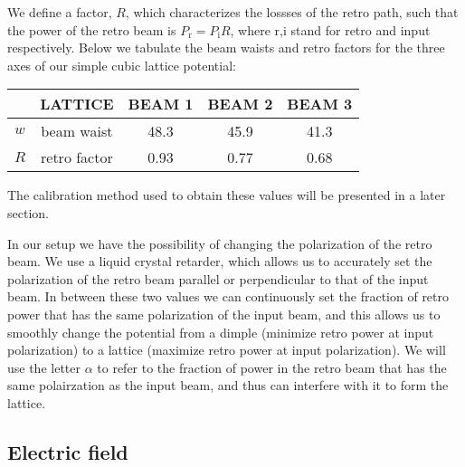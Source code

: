 \documentclass[11pt,letter]{article}
\begin{document}
We define a factor, $R$,  which characterizes the lossses of the retro path,
such that the power of the retro beam is $P_{\text{r}} = P_{\text{i}} R$, where
r,i stand for retro and input respectively.    Below we tabulate the beam
waists and retro factors for the three axes of our simple cubic lattice
potential: 
\begin{center}
\begin{tabular}{c|c|c|c|c}
      & LATTICE& BEAM 1 & BEAM 2 & BEAM 3   \\ \hline \hline 
  $w  $ &  beam waist  & 48.3 & 45.9 & 41.3 \\
  $R $ &  retro factor & 0.93 & 0.77 & 0.68\\
\end{tabular}
\end{center}
The calibration method used to obtain these values will be presented in a later
section. 

In our setup we have the possibility of changing the polarization
of the retro beam.   We use a liquid crystal retarder, which allows us to
accurately set the polarization of the retro beam parallel or perpendicular to
that of the input beam.   In between these two values we can continuously set
the fraction of retro power that has the same polarization of the input beam,
and this allows us to smoothly change the potential from a dimple (minimize
retro power at input polarization) to a lattice (maximize retro power at input
polarization).    We will use the letter $\alpha$ to refer to the fraction of
power in the retro beam that has the same polairzation as the input beam, and
thus can interfere with it to form the lattice. 

\subsection{Electric field}
\end{document}
